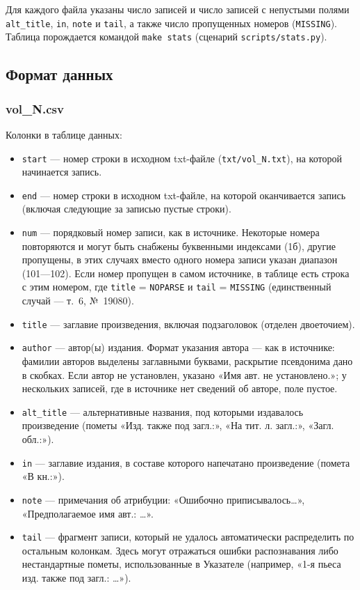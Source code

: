 \documentclass[
  russian,
]{article}
\providecommand{\tightlist}{%
  \setlength{\itemsep}{0pt}\setlength{\parskip}{0pt}}
\begin{document}
Для каждого файла указаны число записей и число записей с непустыми
полями \texttt{alt\_title}, \texttt{in}, \texttt{note} и \texttt{tail},
а также число пропущенных номеров (\texttt{MISSING}). Таблица
порождается командой \texttt{make\ stats} (сценарий
\texttt{scripts/stats.py}).

\subsection{Формат
данных}\label{ux444ux43eux440ux43cux430ux442-ux434ux430ux43dux43dux44bux445}

\subsubsection{vol\_N.csv}\label{vol_n.csv}

Колонки в таблице данных:

\begin{itemize}
\tightlist
\item
  \texttt{start} --- номер строки в исходном txt-файле
  (\texttt{txt/vol\_N.txt}), на которой начинается запись.
\item
  \texttt{end} --- номер строки в исходном txt-файле, на которой
  оканчивается запись (включая следующие за записью пустые строки).
\item
  \texttt{num} --- порядковый номер записи, как в источнике. Некоторые
  номера повторяются и могут быть снабжены буквенными индексами (1б),
  другие пропущены, в этих случаях вместо одного номера записи указан
  диапазон (101---102). Если номер пропущен в самом источнике, в таблице
  есть строка с этим номером, где \texttt{title} = \texttt{NOPARSE} и
  \texttt{tail} = \texttt{MISSING} (единственный случай --- т.~6,
  №~19080).
\item
  \texttt{title} --- заглавие произведения, включая подзаголовок
  (отделен двоеточием).
\item
  \texttt{author} --- автор(ы) издания. Формат указания автора --- как в
  источнике: фамилии авторов выделены заглавными буквами, раскрытие
  псевдонима дано в скобках. Если автор не установлен, указано «Имя авт.
  не установлено.»; у нескольких записей, где в источнике нет сведений
  об авторе, поле пустое.
\item
  \texttt{alt\_title} --- альтернативные названия, под которыми
  издавалось произведение (пометы «Изд. также под загл.:», «На тит. л.
  загл.:», «Загл. обл.:»).
\item
  \texttt{in} --- заглавие издания, в составе которого напечатано
  произведение (помета «В кн.:»).
\item
  \texttt{note} --- примечания об атрибуции: «Ошибочно
  приписывалось\ldots», «Предполагаемое имя авт.: \ldots».
\item
  \texttt{tail} --- фрагмент записи, который не удалось автоматически
  распределить по остальным колонкам. Здесь могут отражаться ошибки
  распознавания либо нестандартные пометы, использованные в Указателе
  (например, «1-я пьеса изд. также под загл.: \ldots»).
\end{itemize}
\end{document}
